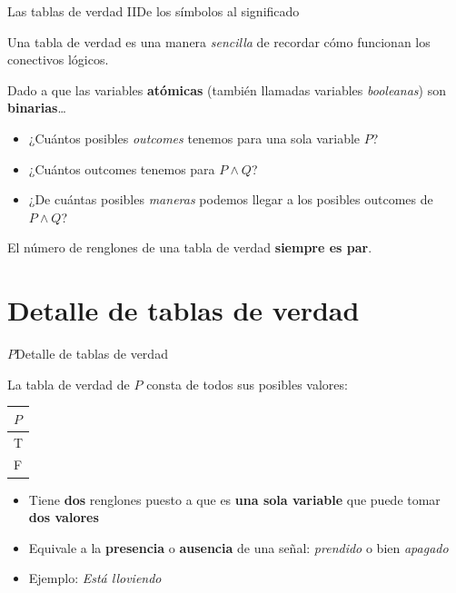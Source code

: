\documentclass[spanish, c]{beamer}
\begin{document}
\begin{frame}{Las tablas de verdad II}{De los símbolos al significado}

    Una \alert{tabla de verdad} es una manera \textit{sencilla} de recordar cómo funcionan los conectivos lógicos. \pause

    \bigskip

    Dado a que las variables \textbf{atómicas} (también llamadas variables \textit{booleanas}) son \textbf{binarias}\dots \pause
    
    \begin{itemize}[<+->]
        \item ¿Cuántos posibles \textit{outcomes} tenemos para una sola variable $P$?
        \item ¿Cuántos outcomes tenemos para $P \wedge Q$?
        \item ¿De cuántas posibles \textit{maneras} podemos llegar a los posibles outcomes de $P \wedge Q$?
    \end{itemize} \pause

    \bigskip
    
    El número de renglones de una tabla de verdad \textbf{siempre es par}.

\end{frame}

\section{Detalle de tablas de verdad}

\begin{frame}{$P$}{Detalle de tablas de verdad}

    La tabla de verdad de $P$ consta de todos sus posibles valores: \pause

\begin{table}[H]
    \begin{tabular}{@{}l@{}}
    \toprule
    $P$ \\ \midrule
    T \\
    F \\ \bottomrule
    \end{tabular}
\end{table} \pause

\begin{itemize}[<+->]
    \item Tiene \textbf{dos} renglones puesto a que es \textbf{una sola variable} que puede tomar \textbf{dos valores}
    \item Equivale a la \textbf{presencia} o \textbf{ausencia} de una señal: \textit{prendido} o bien \textit{apagado}
    \item Ejemplo: \textit{Está lloviendo}
\end{itemize}
\end{frame}
\end{document}
